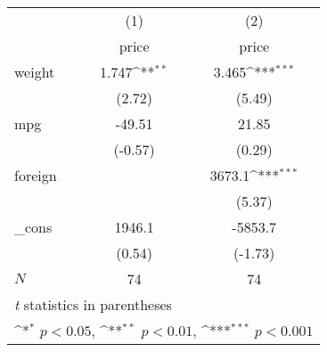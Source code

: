 {
\def\sym#1{\ifmmode^{#1}\else\(^{#1}\)\fi}
\begin{tabular}{l*{2}{c}}
\hline\hline
            &\multicolumn{1}{c}{(1)}&\multicolumn{1}{c}{(2)}\\
            &\multicolumn{1}{c}{price}&\multicolumn{1}{c}{price}\\
\hline
weight      &       1.747\sym{**} &       3.465\sym{***}\\
            &      (2.72)         &      (5.49)         \\
[1em]
mpg         &      -49.51         &       21.85         \\
            &     (-0.57)         &      (0.29)         \\
[1em]
foreign     &                     &      3673.1\sym{***}\\
            &                     &      (5.37)         \\
[1em]
\_cons      &      1946.1         &     -5853.7         \\
            &      (0.54)         &     (-1.73)         \\
\hline
\(N\)       &          74         &          74         \\
\hline\hline
\multicolumn{3}{l}{\footnotesize \textit{t} statistics in parentheses}\\
\multicolumn{3}{l}{\footnotesize \sym{*} \(p<0.05\), \sym{**} \(p<0.01\), \sym{***} \(p<0.001\)}\\
\end{tabular}
}
